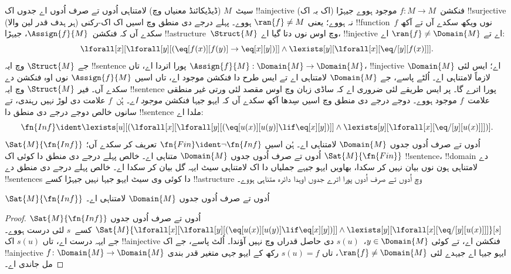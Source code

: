\documentclass[../../../include/open-logic-section]{subfiles}
\begin{document}


سیٹ~$M$ (ڈیڈیکائنڈ معنیاں وچ) لامتناہی اُدوں تے صرف اُدوں اے جدوں
اک !!a{injective} (اک بہ اک) فنکشن~$f\colon M
\to M$ موجود ہووے جیہڑا !!{surjective} (ہر ہدف قدر لین والا) نہ ہووے؛ یعنی $\ran{f} \neq M$
ہووے۔ پہلے درجے دی منطق وچ اسیں اک اک-رکنی !!{function}~$f$ نوں
ویکھ سکدے آں تے آکھ سکدے آں کہ فنکشن~$\Assign{f}{M}$، جیہڑا
!!a{structure}~$\Struct{M}$ وچ اوس نوں دتا گیا اے، !!{injective}
اے تے $\ran{f} \neq
\Domain{M}$ اے:
\[
\lforall[x][\lforall[y][(\eq[f(x)][f(y)] \to \eq[x][y])]] \land
\lexists[y][\lforall[x][\eq/[y][f(x)]]].
\]
جے $\Struct{M}$ وچ ایہ !!{sentence} پورا اتردا اے، تاں
$\Assign{f}{M}:
\Domain{M} \to \Domain{M}$، !!{injective} اے؛ ایس لئی
$\Domain{M}$ لازماً لامتناہی اے۔ اُلٹے پاسے، جے $\Domain{M}$
لامتناہی اے تے ایس طرح دا فنکشن موجود اے، تاں اسیں
$\Assign{f}{M}$ نوں اوہ فنکشن دے سکدے آں۔ فیر $\Struct{M}$
وچ ایہ !!{sentence} پورا اترے گا۔ پر ایس طریقے لئی ضروری اے کہ ساڈی
زبان وچ اوس مقصد لئی ورتی غیر منطقی علامت~$f$ موجود ہووے۔
دوجے درجے دی منطق وچ اسیں سِدھا آکھ سکدے آں کہ ایہو جیہا فنکشن
\emph{موجود اے}۔ ہُن~$f$ علامت دی لوڑ نہیں رہندی، تے سانوں خالص
دوجے درجے دی منطق دا !!{sentence} ملدا اے:
\[
\fn{Inf} \ident \lexists[u][(\lforall[x][\lforall[y][(\eq[u(x)][u(y)]
      \lif \eq[x][y])]] \land \lexists[y][\lforall[x][\eq/[y][u(x)]]])].
\]
$\Sat{M}{\fn{Inf}}$ اُدوں تے صرف اُدوں جدوں $\Domain{M}$
لامتناہی اے۔ ہُن اسیں $\fn{Fin} \ident \lnot \fn{Inf}$ تعریف
کر سکدے آں؛ $\Sat{M}{\fn{Fin}}$ اُدوں تے صرف اُدوں جدوں
$\Domain{M}$ متناہی اے۔ خالص پہلے درجے دی منطق دا کوئی اک
!!{sentence}، !!{domain} دے لامتناہی ہون نوں بیان نہیں کر سکدا،
بھاویں ایہو جیہے جملیاں دا اک لامتناہی سیٹ ایہہ گل بیان کر سکدا اے۔
خالص پہلے درجے دی منطق دے !!{sentence}s دا کوئی وی سیٹ ایہو
جیہا نہیں جیہڑا کسے !!a{structure} وچ اُدوں تے صرف اُدوں پورا اترے
جدوں اوہدا دائرہ متناہی ہووے۔

\begin{prop}
$\Sat{M}{\fn{Inf}}$ اُدوں تے صرف اُدوں جدوں $\Domain{M}$ لامتناہی اے۔
\end{prop}

\begin{proof}
$\Sat{M}{\fn{Inf}}$ اُدوں تے صرف اُدوں جدوں
  $\Sat{M}{\lforall[x][\lforall[y][(\eq[u(x)][u(y)] \lif \eq[x][y])]]
    \land \lexists[y][\lforall[x][\eq/[y][u(x)]]]}[s]$ کسے~$s$
  لئی درست ہووے۔ جے ایہہ درست اے، تاں $s(u)$ اک !!a{injective}
  فنکشن اے، تے کوئی $y \in \Domain{M}$،~$s(u)$ دی حاصل قدراں
  وچ نہیں آؤندا۔ اُلٹ پاسے، جے اک !!a{injective}
  $f\colon \Domain{M} \to \Domain{M}$ ایہو جیہا اے جیہدے لئی
  $\ran{f}
  \neq \Domain{M}$، تاں $s(u) = f$ رکھ کے ایہو جہی متغیر
  قدر بندی مل جاندی اے۔
\end{proof}
\end{document}
